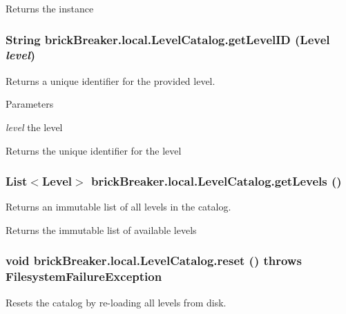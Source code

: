 \begin{DoxyReturn}{Returns}
the instance 
\end{DoxyReturn}
\hypertarget{classbrick_breaker_1_1local_1_1_level_catalog_acb192b0db7f4a495d3674fa6b6996a56}{
\subsubsection[{getLevelID}]{\setlength{\rightskip}{0pt plus 5cm}String brickBreaker.local.LevelCatalog.getLevelID ({\bf Level} {\em level})}}
\label{classbrick_breaker_1_1local_1_1_level_catalog_acb192b0db7f4a495d3674fa6b6996a56}
Returns a unique identifier for the provided level.


\begin{DoxyParams}{Parameters}
\item[{\em level}]the level \end{DoxyParams}
\begin{DoxyReturn}{Returns}
the unique identifier for the level 
\end{DoxyReturn}
\hypertarget{classbrick_breaker_1_1local_1_1_level_catalog_a34873e8d58b5e3570da7312b714f1e13}{
\subsubsection[{getLevels}]{\setlength{\rightskip}{0pt plus 5cm}List$<${\bf Level}$>$ brickBreaker.local.LevelCatalog.getLevels ()}}
\label{classbrick_breaker_1_1local_1_1_level_catalog_a34873e8d58b5e3570da7312b714f1e13}
Returns an immutable list of all levels in the catalog.

\begin{DoxyReturn}{Returns}
the immutable list of available levels 
\end{DoxyReturn}
\hypertarget{classbrick_breaker_1_1local_1_1_level_catalog_a3cb48b330d53535457d9aeb4f2f7fb32}{
\subsubsection[{reset}]{\setlength{\rightskip}{0pt plus 5cm}void brickBreaker.local.LevelCatalog.reset ()  throws {\bf FilesystemFailureException} }}
\label{classbrick_breaker_1_1local_1_1_level_catalog_a3cb48b330d53535457d9aeb4f2f7fb32}
Resets the catalog by re-\/loading all levels from disk.



